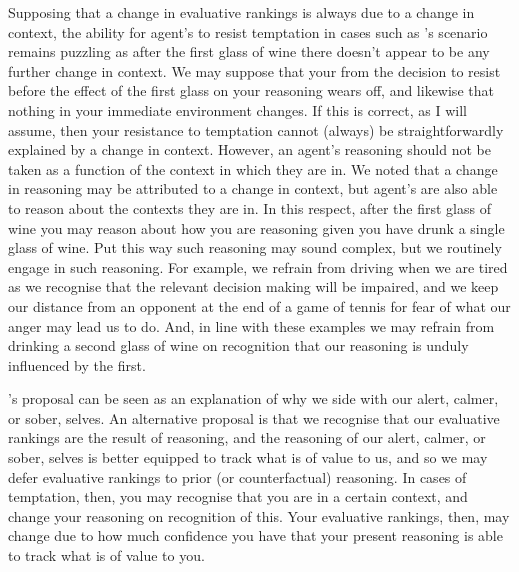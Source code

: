 \documentclass[10pt]{article}
\begin{document}
Supposing that a change in evaluative rankings is always due to a change in context, the ability for agent's to resist temptation in cases such as \citeauthor{Bratman:2007ab}'s scenario remains puzzling as after the first glass of wine there doesn't appear to be any further change in context.
We may suppose that your from the decision to resist before the effect of the first glass on your reasoning wears off, and likewise that nothing in your immediate environment changes.
If this is correct, as I will assume, then your resistance to temptation cannot (always) be straightforwardly explained by a change in context.
However, an agent's reasoning should not be taken as a function of the context in which they are in.
We noted that a change in reasoning may be attributed to a change in context, but agent's are also able to reason about the contexts they are in.
In this respect, after the first glass of wine you may reason about how you are reasoning given you have drunk a single glass of wine.
Put this way such reasoning may sound complex, but we routinely engage in such reasoning.
For example, we refrain from driving when we are tired as we recognise that the relevant decision making will be impaired, and we keep our distance from an opponent at the end of a game of tennis for fear of what our anger may lead us to do.
And, in line with these examples we may refrain from drinking a second glass of wine on recognition that our reasoning is unduly influenced by the first.

\citeauthor{Bratman:2007ab}'s proposal can be seen as an explanation of why we side with our alert, calmer, or sober, selves.
An alternative proposal is that we recognise that our evaluative rankings are the result of reasoning, and the reasoning of our alert, calmer, or sober, selves is better equipped to track what is of value to us, and so we may defer evaluative rankings to prior (or counterfactual) reasoning.
In cases of temptation, then, you may recognise that you are in a certain context, and change your reasoning on recognition of this.
Your evaluative rankings, then, may change due to how much confidence you have that your present reasoning is able to track what is of value to you.






\end{document}
